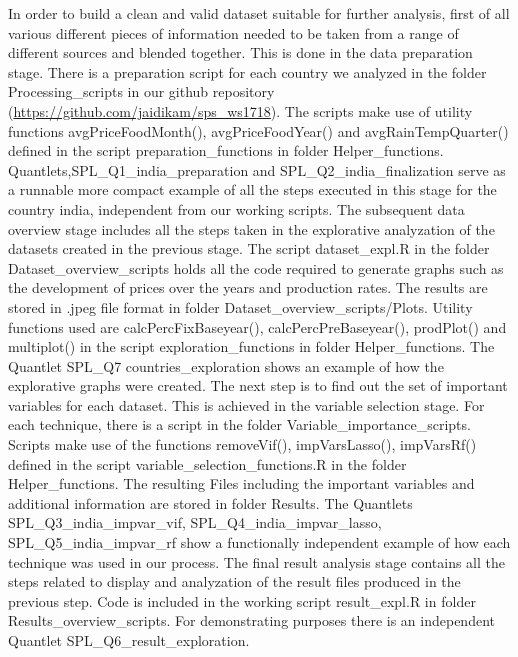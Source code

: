 \documentclass[11pt]{article}
\begin{document}
\newpage
In order to build a clean and valid dataset suitable for further analysis, first of all various different pieces of information needed to be taken from a range of different sources and blended together. This is done in the data preparation stage. There is a preparation script for each country we analyzed in the folder Processing\_scripts in our github repository (\url{https://github.com/jaidikam/sps_ws1718}). The scripts make use of utility functions avgPriceFoodMonth(), avgPriceFoodYear() and avgRainTempQuarter() defined in the script preparation\_functions in folder Helper\_functions. Quantlets,SPL\_Q1\_india\_preparation and SPL\_Q2\_india\_finalization serve as a runnable more compact example of all the steps executed in this stage for the country india, independent from our working scripts.
The subsequent data overview stage includes all the steps taken in the explorative analyzation of the datasets created in the previous stage. The script dataset\_expl.R in the folder Dataset\_overview\_scripts holds all the code required to generate graphs such as the development of prices over the years and production rates. The results are stored in .jpeg file format in folder Dataset\_overview\_scripts/Plots. Utility functions used are calcPercFixBaseyear(), calcPercPreBaseyear(), prodPlot() and multiplot() in the script exploration\_functions in folder Helper\_functions. The Quantlet SPL\_Q7 countries\_exploration shows an example of how the explorative graphs were created. 
The next step is to find out the set of important variables for each dataset. This is achieved in the variable selection stage. For each technique, there is a script in the folder Variable\_importance\_scripts. Scripts make use of the functions removeVif(), impVarsLasso(), impVarsRf() defined in the script variable\_selection\_functions.R in the folder Helper\_functions. The resulting Files including the important variables and additional information are stored in folder Results.
The Quantlets SPL\_Q3\_india\_impvar\_vif, SPL\_Q4\_india\_impvar\_lasso, SPL\_Q5\_india\_impvar\_rf show a functionally independent example of how each technique was used in our process.
The final result analysis stage contains all the steps related to display and analyzation of the result files produced in the previous step. Code is included in the working script result\_expl.R in folder Results\_overview\_scripts. For demonstrating purposes there is an independent Quantlet SPL\_Q6\_result\_exploration.
\end{document}
